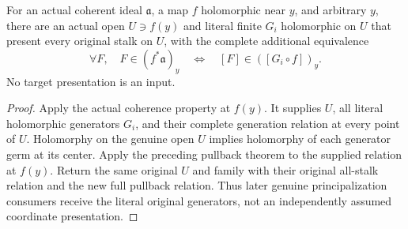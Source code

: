 \begin{theorem}
\label{trace:actual-coherent-pullback-finite-generators}
\leanok
For an actual coherent ideal $\mathfrak a$, a map $f$ holomorphic near
$y$, and arbitrary $y$, there are an actual open $U\ni f(y)$ and
literal finite $G_i$ holomorphic on $U$ that present every original
stalk on $U$, with the complete additional equivalence
\[
 \forall F,\quad F\in(f^*\mathfrak a)_y
 \quad\Longleftrightarrow\quad[F]\in([G_i\circ f])_y.
\]
No target presentation is an input.
\end{theorem}
\begin{proof}
Apply the actual coherence property at $f(y)$. It supplies $U$, all
literal holomorphic generators $G_i$, and their complete generation
relation at every point of $U$. Holomorphy on the genuine open $U$
implies holomorphy of each generator germ at its center. Apply the
preceding pullback theorem to the supplied relation at $f(y)$.
Return the same original $U$ and family with their original all-stalk
relation and the new full pullback relation. Thus later genuine
principalization consumers receive the literal original generators,
not an independently assumed coordinate presentation.
\end{proof}
